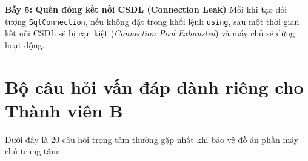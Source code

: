 \documentclass[12pt,a4paper]{article}
\begin{document}
\begin{pitfallbox}
\textbf{Bẫy 5: Quên đóng kết nối CSDL (Connection Leak)}
\newline Mỗi khi tạo đối tượng \texttt{SqlConnection}, nếu không đặt trong khối lệnh \texttt{using}, sau một thời gian kết nối CSDL sẽ bị cạn kiệt (\textit{Connection Pool Exhausted}) và máy chủ sẽ dừng hoạt động.
\end{pitfallbox}

\section{Bộ câu hỏi vấn đáp dành riêng cho Thành viên B}

Dưới đây là 20 câu hỏi trọng tâm thường gặp nhất khi bảo vệ đồ án phần máy chủ trung tâm:
\end{document}
